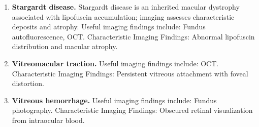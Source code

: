 \begin{enumerate}[leftmargin=*,itemsep=0.45em,topsep=0.4em]
\item \textbf{Stargardt disease.} Stargardt disease is an inherited macular dystrophy associated with lipofuscin accumulation; imaging assesses characteristic deposits and atrophy. Useful imaging findings include: Fundus autofluorescence, OCT. Characteristic Imaging Findings: Abnormal lipofuscin distribution and macular atrophy.
\item \textbf{Vitreomacular traction.} Useful imaging findings include: OCT. Characteristic Imaging Findings: Persistent vitreous attachment with foveal distortion.
\item \textbf{Vitreous hemorrhage.} Useful imaging findings include: Fundus photography. Characteristic Imaging Findings: Obscured retinal visualization from intraocular blood.
\end{enumerate}


